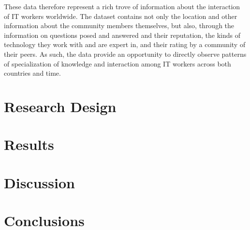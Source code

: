 \documentclass[11pt]{article}
\begin{document}
These data therefore represent a rich trove of information about the
interaction of IT workers worldwide. The dataset contains not only the location
and other information about the community members themselves, but also,
through the information on questions posed and answered and their reputation, the
kinds of technology they work with and are expert in, and their rating by
a community of their peers. As such, the data provide an opportunity
to directly observe patterns of specialization of knowledge and
interaction among IT workers across both countries and time. 


 


\section{Research Design}
\label{sec:research-design}

\section{Results}
\label{sec:results}

\section{Discussion}
\label{sec:discussion}

\section{Conclusions}
\label{sec:conclusions}


\FloatBarrier


\end{document}
